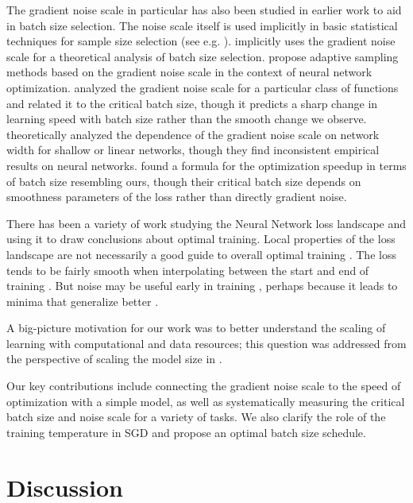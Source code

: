 \documentclass[english]{article}
\begin{document}
The gradient noise scale in particular has also been studied in earlier work to aid in batch size selection.  The noise scale itself is used implicitly in basic statistical techniques for sample size selection (see e.g. \cite{Wiki_noise,NIST_noise}).
\cite{Byrd2012} implicitly uses the gradient noise scale for a theoretical analysis of batch size selection.
\cite{1606.04838,1610.05792,1612.05086} propose adaptive sampling methods based on the gradient noise scale in the context of neural network optimization. 
\cite{1706.05699} analyzed the gradient noise scale for a particular class of functions and related it to the critical batch size, though it predicts a sharp change in learning speed with batch size rather than the smooth change we observe.
\cite{1806.03791} theoretically analyzed the dependence of the gradient noise scale on network width for shallow or linear networks, though they find inconsistent empirical results on neural networks.
\cite{1712.06559} found a formula for the optimization speedup in terms of batch size resembling ours, though their critical batch size depends on smoothness parameters of the loss rather than directly gradient noise.

There has been a variety of work studying the Neural Network loss landscape and using it to draw conclusions about optimal training. Local properties of the loss landscape are not necessarily a good guide to overall optimal training \cite{1803.02021}. The loss tends to be fairly smooth when interpolating between the start and end of training \cite{1412.6544}. But noise may be useful early in training \cite{1511.06807,1706.05699}, perhaps because it leads to minima that generalize better \cite{1609.04836}.

A big-picture motivation for our work was to better understand the scaling of learning with computational and data resources; this question was addressed from the perspective of scaling the model size in \cite{1712.00409}.

Our key contributions include connecting the gradient noise scale to the speed of optimization with a simple model, as well as systematically measuring the critical batch size and noise scale for a variety of tasks.  We also clarify the role of the training temperature in SGD and propose an optimal batch size schedule.

\section{Discussion}
\end{document}
